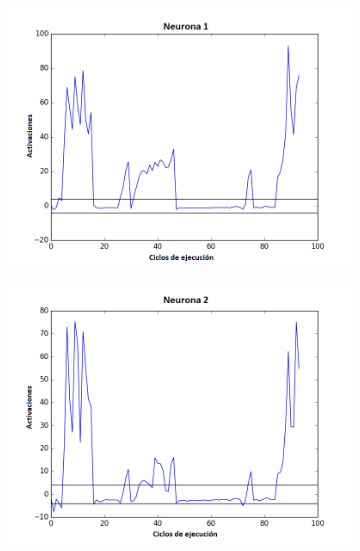\begin{figure}[!h]
    \centering %
\begin{subfigure}{0.33\textwidth}
  \includegraphics[width=\linewidth]{Imagenes/Agente2Activaciones/Agente1/Neurona0}
\end{subfigure}\hfil %
\begin{subfigure}{0.33\textwidth}
  \includegraphics[width=\linewidth]{Imagenes/Agente2Activaciones/Agente1/Neurona1}
\end{subfigure}\hfil %
\begin{subfigure}{0.33\textwidth}

\end{subfigure}
\end{figure}
